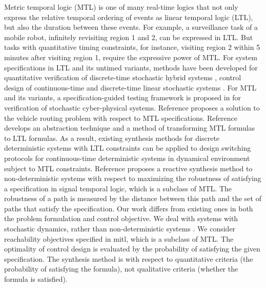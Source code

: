 \documentclass[letterpaper, 10 pt, conference]{ieeeconf}
\begin{document}
Metric temporal logic (MTL) is one of many real-time logics that not
only express the relative temporal ordering of events as linear
temporal logic (LTL), but also the duration between these events. For
example, a surveillance task of a mobile robot, infinitely revisiting
region 1 and 2, can be expressed in LTL. But tasks with quantitative
timing constraints, for instance, visiting region 2 within 5 minutes
after visiting region 1, require the expressive power of MTL. For
system specifications in LTL and its untimed variants, methods have
been developed for quantitative verification of discrete-time
stochastic hybrid systems
\cite{abate2010approximate,abate2011quantitative}, control design of
continuous-time and discrete-time linear stochastic systems
\cite{lahijanian2009probabilistic,Maria2015}.  For MTL and its
variants, a specification-guided testing framework is proposed in
\cite{Abbas2014} for verification of stochastic cyber-physical
systems.  Reference \cite{Karaman2008} proposes a solution to the
vehicle routing problem with respect to MTL specifications. Reference
\cite{JunLiu2014} develops an abstraction technique and a method of
transforming MTL formulas to LTL formulas. As a result, existing
synthesis methods for discrete deterministic systems with LTL
constraints can be applied to design switching protocols for
continuous-time deterministic systems in dynamical environment subject
to MTL constraints. Reference \cite{VasuHSCC} proposes a reactive
synthesis method to non-deterministic systems with respect to
maximizing the robustness of satisfying a specification in signal
temporal logic, which is a subclass of MTL. The robustness of a path
is measured by the distance between this path and the set of paths
that satisfy the specification.
Our work differs from existing ones in both the problem formulation
and control objective.  We deal with systems with stochastic dynamics,
rather than non-deterministic systems \cite{VasuHSCC,JunLiu2014}.  We
consider reachability objectives specified in \ac{mitl}, which is a
subclass of MTL. The optimality of control design is evaluated by the
probability of satisfying the given specification. The synthesis
method is with respect to quantitative criteria (the probability of
satisfying the formula), not qualitative criteria (whether the formula
is satisfied).
\end{document}
